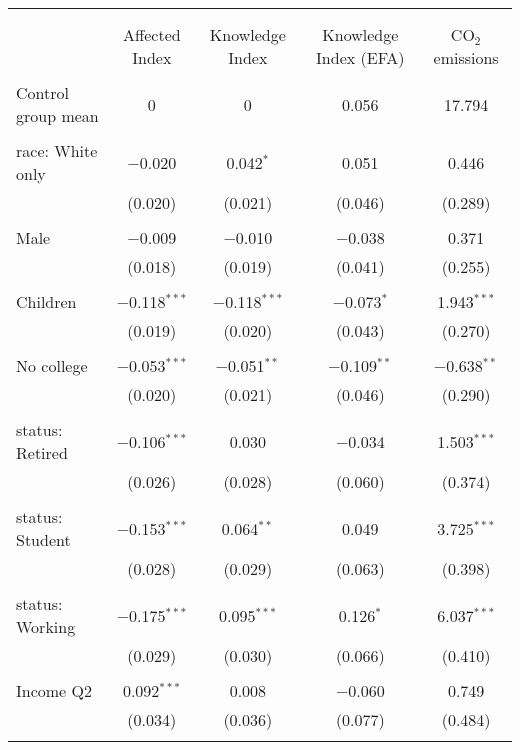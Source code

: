 
\begin{tabular}{@{\extracolsep{5pt}}lcccc} 
\\[-1.8ex]\hline 
\hline \\[-1.8ex] 
\\[-1.8ex] & Affected Index & Knowledge Index & Knowledge Index (EFA) & CO$_{2}$ emissions \\ 
\hline \\[-1.8ex] 
 Control group mean & 0 & 0 & 0.056 & 17.794  \\ \hline \\[-1.8ex] race: White only & $-$0.020 & 0.042$^{*}$ & 0.051 & 0.446 \\ 
  & (0.020) & (0.021) & (0.046) & (0.289) \\ 
  & & & & \\ 
 Male & $-$0.009 & $-$0.010 & $-$0.038 & 0.371 \\ 
  & (0.018) & (0.019) & (0.041) & (0.255) \\ 
  & & & & \\ 
 Children & $-$0.118$^{***}$ & $-$0.118$^{***}$ & $-$0.073$^{*}$ & 1.943$^{***}$ \\ 
  & (0.019) & (0.020) & (0.043) & (0.270) \\ 
  & & & & \\ 
 No college & $-$0.053$^{***}$ & $-$0.051$^{**}$ & $-$0.109$^{**}$ & $-$0.638$^{**}$ \\ 
  & (0.020) & (0.021) & (0.046) & (0.290) \\ 
  & & & & \\ 
 status: Retired & $-$0.106$^{***}$ & 0.030 & $-$0.034 & 1.503$^{***}$ \\ 
  & (0.026) & (0.028) & (0.060) & (0.374) \\ 
  & & & & \\ 
 status: Student & $-$0.153$^{***}$ & 0.064$^{**}$ & 0.049 & 3.725$^{***}$ \\ 
  & (0.028) & (0.029) & (0.063) & (0.398) \\ 
  & & & & \\ 
 status: Working & $-$0.175$^{***}$ & 0.095$^{***}$ & 0.126$^{*}$ & 6.037$^{***}$ \\ 
  & (0.029) & (0.030) & (0.066) & (0.410) \\ 
  & & & & \\ 
 Income Q2 & 0.092$^{***}$ & 0.008 & $-$0.060 & 0.749 \\ 
  & (0.034) & (0.036) & (0.077) & (0.484) \\ 
  & & & & \\ 

\end{tabular}
